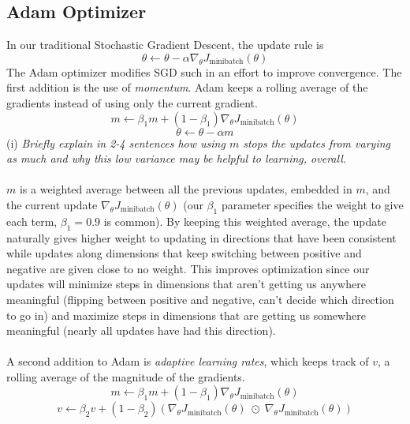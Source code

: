 \documentclass[12pt]{article}
\begin{document}
\subsection{Adam Optimizer}
In our traditional Stochastic Gradient Descent, the update rule is 
\begin{equation*}
    \theta \leftarrow \theta - \alpha \nabla_{\theta} J_{\text{minibatch}}(\theta)
\end{equation*}
The Adam optimizer modifies SGD such in an effort to improve convergence. The first 
addition is the use of \emph{momentum}. Adam keeps a rolling average of the gradients 
instead of using only the current gradient. 
\begin{equation}
    m \leftarrow \beta_1 m + (1 - \beta_1) \nabla_\theta J_{\text{minibatch}} (\theta)
\end{equation}
\begin{equation*}
    \theta \leftarrow \theta - \alpha m
\end{equation*}
(i) \emph{Briefly explain in 2-4 sentences how using $m$ stops the updates from 
varying as much and why this low variance may be helpful to learning, overall.}
~\\
~\\
$m$ is a weighted average between all the previous updates, embedded in $m$, and the current 
update $\nabla_\theta J_{\text{minibatch}}(\theta)$ (our $\beta_1$ parameter specifies the 
weight to give each term, $\beta_1 = 0.9$ is common). By keeping this weighted average, 
the update naturally gives higher weight to updating in directions that have been 
consistent while updates along dimensions that keep switching between positive and negative 
are given close to no weight. This improves optimization since our updates will minimize steps 
in dimensions that aren't getting us anywhere meaningful (flipping between positive and negative, 
can't decide which direction to go in) and maximize steps in dimensions that are getting us 
somewhere meaningful (nearly all updates have had this direction). 
~\\
~\\
A second addition to Adam is \emph{adaptive learning rates}, which keeps track of $v$, a rolling average
of the magnitude of the gradients. 
\begin{equation*}
    m \leftarrow \beta_1 m + (1 - \beta_1) \nabla_\theta J_{\text{minibatch}}(\theta)
\end{equation*}
\begin{equation*}
    v \leftarrow \beta_2 v + (1 - \beta_2) (\nabla_\theta J_{\text{minibatch}}(\theta) 
    \; \odot \; \nabla_\theta J_{\text{minibatch}}(\theta) )
\end{equation*}
\end{document}
